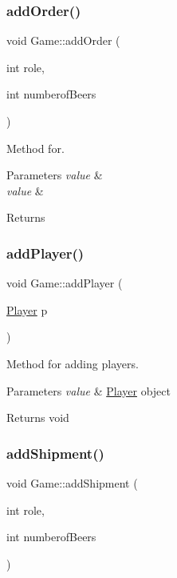 \subsubsection{\texorpdfstring{add\+Order()}{addOrder()}}
{\footnotesize\ttfamily void Game\+::add\+Order (\begin{DoxyParamCaption}\item[{int}]{role,  }\item[{int}]{numberof\+Beers }\end{DoxyParamCaption})}



Method for. 


\begin{DoxyParams}{Parameters}
{\em value} & \\
\hline
{\em value} & \\
\hline
\end{DoxyParams}
\begin{DoxyReturn}{Returns}

\end{DoxyReturn}
\mbox{\label{classGame_a8d55289a3b6f78014ac06f2faa0a7335}} 
\subsubsection{\texorpdfstring{add\+Player()}{addPlayer()}}
{\footnotesize\ttfamily void Game\+::add\+Player (\begin{DoxyParamCaption}\item[{\hyperlink{classPlayer}{Player}}]{p }\end{DoxyParamCaption})}



Method for adding players. 


\begin{DoxyParams}{Parameters}
{\em value} & \hyperlink{classPlayer}{Player} object \\
\hline
\end{DoxyParams}
\begin{DoxyReturn}{Returns}
void 
\end{DoxyReturn}
\mbox{\label{classGame_a378029f01136b72969cba2cd716ff028}} 
\subsubsection{\texorpdfstring{add\+Shipment()}{addShipment()}}
{\footnotesize\ttfamily void Game\+::add\+Shipment (\begin{DoxyParamCaption}\item[{int}]{role,  }\item[{int}]{numberof\+Beers }\end{DoxyParamCaption})}



